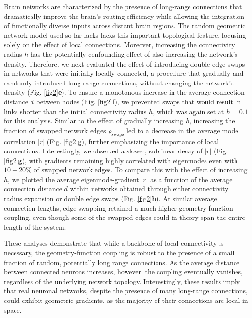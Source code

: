 \documentclass{article}
\begin{document}
Brain networks are characterized by the presence of long-range connections that dramatically improve the brain's routing efficiency while allowing the integration of functionally diverse inputs across distant brain regions\cite{betzel2018specificity}. The random geometric network model used so far lacks lacks this important topological feature, focusing solely on the effect of local connections. Moreover, increasing the connectivity radius $h$ has the potentially confounding effect of also increasing the network's density. Therefore, we next evaluated the effect of introducing double edge swaps in networks that were initially locally connected, a procedure that gradually and randomly introduced long range connections, without changing the network's density (Fig. \ref{fig2}\textbf{e}). To ensure a monotonous increase in the average connection distance $d$ between nodes (Fig. \ref{fig2}\textbf{f}), we prevented swaps that would result in links shorter than the initial connectivity radius $h$, which was again set at $h=0.1$ for this analysis. Similar to the effect of gradually increasing $h$, increasing the fraction of swapped network edges $\rho_{\text{swaps}}$ led to a decrease in the average mode correlation $|r|$ (Fig. \ref{fig2}\textbf{g}), further emphasizing the importance of local connections. Interestingly, we observed a slower, sublinear decay of $|r|$ (Fig. \ref{fig2}\textbf{g}), with gradients remaining highly correlated with eigenmodes even with $10-20\%$ of swapped network edges. To compare this with the effect of increasing $h$, we plotted the average eigenmode-gradient $|r|$ as a function of the average connection distance $d$ within networks obtained through either connectivity radius expansion or double edge swaps (Fig. \ref{fig2}\textbf{h}). At similar average connection lengths, edge swapping retained a much higher geometry-function coupling, even though some of the swapped edges could in theory span the entire length of the system. 

These analyses demonstrate that while a backbone of local connectivity is necessary, the geometry-function coupling is robust to the presence of a small fraction of random, potentially long range connections. As the average distance between connected neurons increases, however, the coupling eventually vanishes, regardless of the underlying network topology. Interestingly, these results imply that real neuronal networks, despite the presence of many long-range connections, could exhibit geometric gradients, as the majority of their connections are local in space\cite{ercsey2013predictive}.
\end{document}

